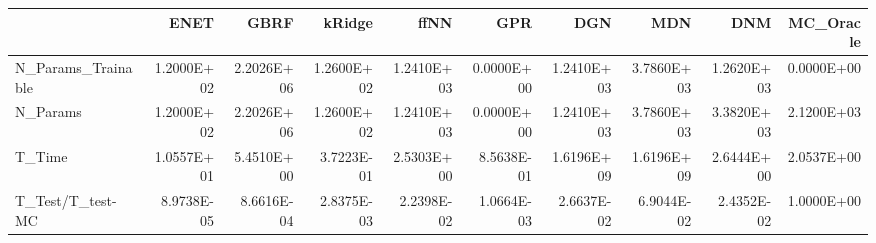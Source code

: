 \begin{tabular}{lrrrrrrrrr}
\toprule
{} &       ENET &       GBRF &     kRidge &       ffNN &        GPR &        DGN &        MDN &        DNM &  MC\_Oracle \\
\midrule
N\_Params\_Trainable & 1.2000E+02 & 2.2026E+06 & 1.2600E+02 & 1.2410E+03 & 0.0000E+00 & 1.2410E+03 & 3.7860E+03 & 1.2620E+03 & 0.0000E+00 \\
N\_Params           & 1.2000E+02 & 2.2026E+06 & 1.2600E+02 & 1.2410E+03 & 0.0000E+00 & 1.2410E+03 & 3.7860E+03 & 3.3820E+03 & 2.1200E+03 \\
T\_Time             & 1.0557E+01 & 5.4510E+00 & 3.7223E-01 & 2.5303E+00 & 8.5638E-01 & 1.6196E+09 & 1.6196E+09 & 2.6444E+00 & 2.0537E+00 \\
T\_Test/T\_test-MC   & 8.9738E-05 & 8.6616E-04 & 2.8375E-03 & 2.2398E-02 & 1.0664E-03 & 2.6637E-02 & 6.9044E-02 & 2.4352E-02 & 1.0000E+00 \\
\bottomrule
\end{tabular}
